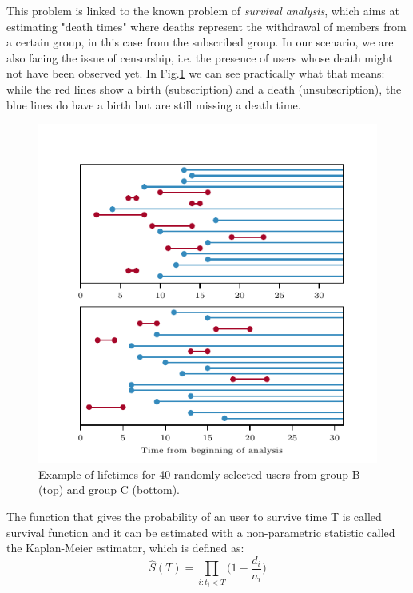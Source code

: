 \documentclass[paper=a4, fontsize=10pt]{report}
\begin{document}
This problem is linked to the known problem of \textit{survival analysis}, which aims at estimating "death times" where deaths represent the withdrawal of members from a certain group,
in this case from the subscribed group. In our scenario, we are also facing the issue of censorship, i.e. the presence of users whose death might not have been observed yet. In Fig.\ref{fig:lifetimes} we can see practically what that means: while the red lines show a birth (subscription)
and a death (unsubscription), the blue lines do have a birth but are still missing a death time.
\begin{figure}[h!]
\centering
\includegraphics[width=.99\columnwidth]{lifetime.pdf}
\caption{Example of lifetimes for 40 randomly selected users from group B (top) and group C (bottom).}
\label{fig:lifetimes}
\end{figure}

The function that gives the probability of an user to survive time T is called survival function and it can be estimated
with a non-parametric statistic called the Kaplan-Meier estimator, which is defined as:
\begin{equation}
 \hat{S}(T) = \prod_{i: t_{i} < T} \Big(1 - \frac{d_{i}}{n_{i}} \Big)
\end{equation}
\end{document}
